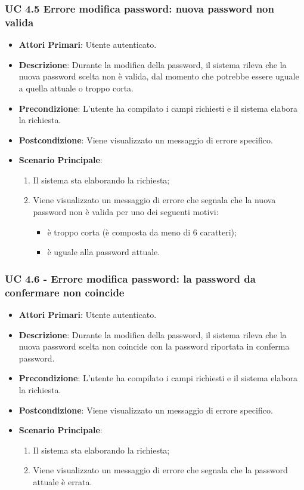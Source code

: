 			\subsubsection{UC 4.5 Errore modifica password: nuova password non valida}
			\begin{itemize}
				\item \textbf{Attori Primari}: Utente autenticato.
				\item \textbf{Descrizione}: Durante la modifica della password, il sistema rileva che la nuova password scelta non è valida, dal momento che potrebbe essere uguale a quella attuale o troppo corta.
				\item \textbf{Precondizione}: L'utente ha compilato i campi richiesti e il sistema elabora la richiesta.
				\item \textbf{Postcondizione}: Viene visualizzato un messaggio di errore specifico.
				\item \textbf{Scenario Principale}:
				\begin{enumerate}
					\item Il sistema sta elaborando la richiesta;
					\item Viene visualizzato un messaggio di errore che segnala che la nuova password non è valida per uno dei seguenti motivi:
					\begin{itemize}
						\item è troppo corta (è composta da meno di 6 caratteri);
						\item è uguale alla password attuale.
					\end{itemize}
				\end{enumerate}
			\end{itemize}

			\subsubsection{UC 4.6 - Errore modifica password: la password da confermare non coincide}
			\begin{itemize}
				\item \textbf{Attori Primari}: Utente autenticato.
				\item \textbf{Descrizione}: Durante la modifica della password, il sistema rileva che la nuova password scelta non coincide con la password riportata in conferma password.
				\item \textbf{Precondizione}: L'utente ha compilato i campi richiesti e il sistema elabora la richiesta.
				\item \textbf{Postcondizione}: Viene visualizzato un messaggio di errore specifico.
				\item \textbf{Scenario Principale}:
				\begin{enumerate}
					\item Il sistema sta elaborando la richiesta;
					\item Viene visualizzato un messaggio di errore che segnala che la password attuale è errata.
				\end{enumerate}
			\end{itemize}
			
